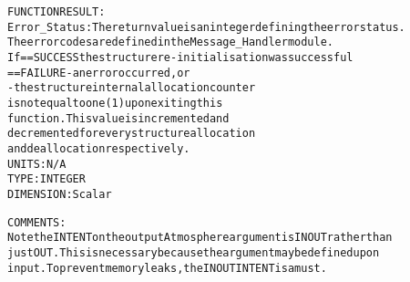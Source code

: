 \begin{alltt}
 
  FUNCTION RESULT:
        Error_Status: The return value is an integer defining the error status.
                      The error codes are defined in the Message_Handler module.
                      If == SUCCESS the structure re-initialisation was successful
                         == FAILURE - an error occurred, or
                                    - the structure internal allocation counter
                                      is not equal to one (1) upon exiting this
                                      function. This value is incremented and
                                      decremented for every structure allocation
                                      and deallocation respectively.
                      UNITS:      N/A
                      TYPE:       INTEGER
                      DIMENSION:  Scalar
 
  COMMENTS:
        Note the INTENT on the output Atmosphere argument is IN OUT rather than
        just OUT. This is necessary because the argument may be defined upon
        input. To prevent memory leaks, the IN OUT INTENT is a must.
 
  \end{alltt}
